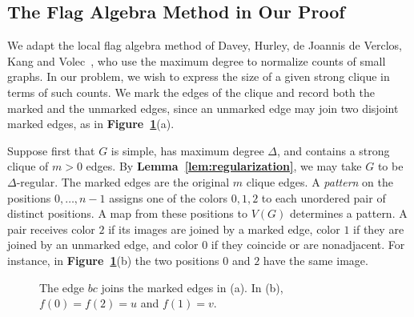 \documentclass[preprint,11pt,numbers]{elsarticle-arxiv}
\numberwithin{equation}{section}
\theoremstyle{definition}
\begin{document}
\subsection{The Flag Algebra Method in Our Proof}\label{subsec:adapted-flags}

We adapt the local flag algebra method of Davey, Hurley, de Joannis de
Verclos, Kang and Volec~\cite{DaveyEtAlLocal2026,DaveyEtAlStrong2026},
who use the maximum degree to normalize counts of small graphs.
In our problem, we wish to express the size of a given strong clique
in terms of such counts. We mark the edges of the clique and record
both the marked and the unmarked edges, since an unmarked edge may
join two disjoint marked edges, as in \textbf{Figure~\ref{fig:marked-maps}}(a).

Suppose first that $G$ is simple, has maximum degree $\Delta$, and
contains a strong clique of $m>0$ edges. By
\textbf{Lemma~\ref{lem:regularization}}, we may take $G$ to be
$\Delta$-regular. The marked edges are the original $m$ clique edges.
A \emph{pattern} on the positions $0,\ldots,n-1$ assigns one of the
colors $0,1,2$ to each unordered pair of distinct positions.
A map from these positions to $V(G)$ determines a pattern. A pair
receives color $2$ if its images are joined by a marked edge, color
$1$ if they are joined by an unmarked edge, and color $0$ if they
coincide or are nonadjacent. For instance, in
\textbf{Figure~\ref{fig:marked-maps}}(b) the two positions $0$ and
$2$ have the same image.

\begin{figure}[htbp]
\centering
{}
\caption{The edge $bc$ joins the marked edges in (a).
In (b), $f(0)=f(2)=u$ and $f(1)=v$.}
\label{fig:marked-maps}
\end{figure}
\end{document}
